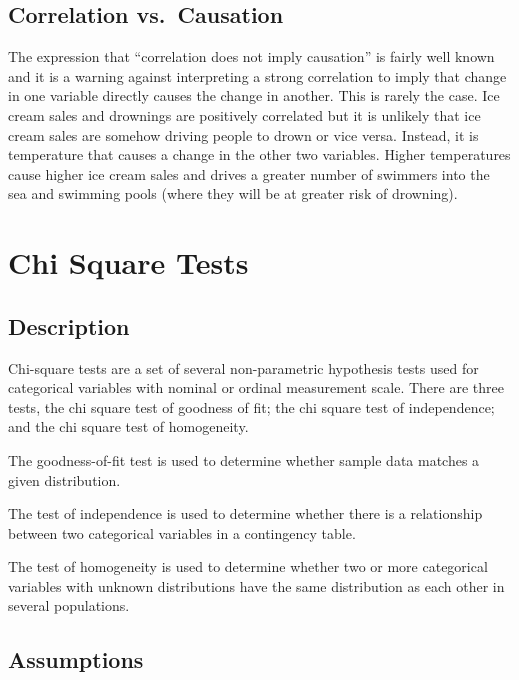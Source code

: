 \documentclass[
]{book}
\begin{document}
\hypertarget{correlation-vs.-causation}{%
\section{Correlation vs.~Causation}\label{correlation-vs.-causation}}

The expression that ``correlation does not imply causation'' is fairly well known and it is a warning against interpreting a strong correlation to imply that change in one variable directly causes the change in another. This is rarely the case. Ice cream sales and drownings are positively correlated but it is unlikely that ice cream sales are somehow driving people to drown or vice versa. Instead, it is temperature that causes a change in the other two variables. Higher temperatures cause higher ice cream sales and drives a greater number of swimmers into the sea and swimming pools (where they will be at greater risk of drowning).

\hypertarget{chisq}{%
\chapter{Chi Square Tests}\label{chisq}}

\hypertarget{description}{%
\section{Description}\label{description}}

Chi-square tests are a set of several non-parametric hypothesis tests used for categorical variables with nominal or ordinal measurement scale. There are three tests, the chi square test of goodness of fit; the chi square test of independence; and the chi square test of homogeneity.

The goodness-of-fit test is used to determine whether sample data matches a given distribution.

The test of independence is used to determine whether there is a relationship between two categorical variables in a contingency table.

The test of homogeneity is used to determine whether two or more categorical variables with unknown distributions have the same distribution as each other in several populations.

\hypertarget{assumptions}{%
\section{Assumptions}\label{assumptions}}
\end{document}

